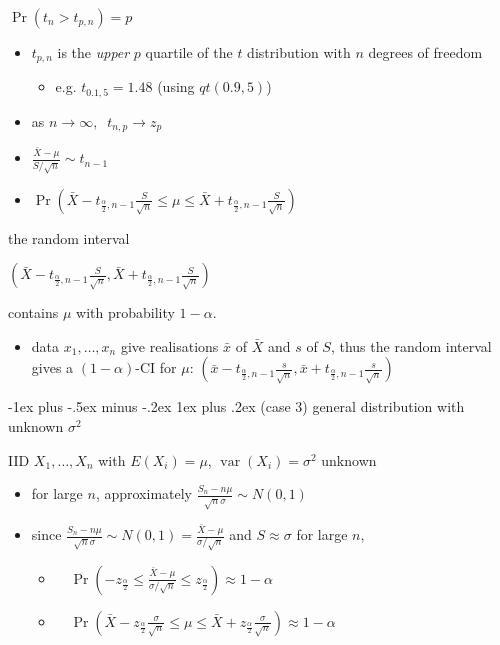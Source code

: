 \documentclass[10pt, landscape]{article}
\makeatletter
\renewcommand{\subsubsection}{\@startsection{subsubsection}{3}{0mm}%
  {-1ex plus -.5ex minus -.2ex}%
  {1ex plus .2ex}%
{\normalfont\small\bfseries}}%
\newcommand{\var}{\mathop{\mathrm{var}}}
\newcommand{\xbar}{\bar{x}}
\newcommand{\Xbar}{\bar{X}}
\newcommand{\seq}[2][n]{#2_1, \dots, #2_{#1}}
\makeatother
\begin{document}
\begin{multicols*}{4}
\begin{tightcenter}
    $\Pr(t_n > t_{p,n}) = p$
  \end{tightcenter}

  \begin{itemize}
    \item $t_{p,n}$ is the \textit{upper} $p$ quartile of the $t$ distribution with $n$ degrees of freedom
      \begin{itemize}
        \item e.g. $t_{0.1,5} = 1.48$ (using $qt(0.9,5)$)
      \end{itemize}
    \item as $n \to \infty, \;\; t_{n,p} \to z_p$
    \item $\frac{\Xbar - \mu}{S/\sqrt n} \sim t_{n-1}$
    \item $\Pr( \Xbar - t_{\frac{\alpha}{2}, n-1} \frac{S}{\sqrt n} \leq \mu \leq \Xbar + t_{\frac{\alpha}{2}, n-1} \frac{S}{\sqrt n})$
  \end{itemize}

  \begin{tightcenter}
    the random interval

    $\left(\Xbar - t_{\frac{\alpha}{2}, n-1} \frac{S}{\sqrt n},  \Xbar + t_{\frac{\alpha}{2}, n-1} \frac{S}{\sqrt n}\right)$

    contains $\mu$ with probability $1-\alpha$.
  \end{tightcenter}

  \begin{itemize}
    \item data $\seq{x}$ give realisations $\xbar$ of $\Xbar$ and $s$ of $S$, thus the random interval gives a $(1-\alpha)$-CI for $\mu$: 
      $\left(\xbar - t_{\frac{\alpha}{2}, n-1} \frac{s}{\sqrt n},  \xbar + t_{\frac{\alpha}{2}, n-1} \frac{s}{\sqrt n}\right)$
  \end{itemize}

  \subsubsection{(case 3) general distribution with unknown $\sigma^2$}

  IID $\seq{X}$ with $E(X_i) =\mu$, $\var(X_i) = \sigma^2$ unknown

  \begin{itemize}
    \item for large $n$, approximately $\frac{S_n - n\mu}{\sqrt n \sigma} \sim N(0,1)$
    \item since $\frac{S_n - n\mu}{\sqrt n \sigma} \sim N(0,1) =  \frac{\Xbar - \mu}{\sigma / \sqrt n}$ and $S \approx \sigma$ for large $n$,
      \begin{itemize}
        \item $\quad \Pr(-z_{\frac{\alpha}{2}} \leq \frac{\Xbar - \mu}{\sigma / \sqrt n} \leq z_{\frac{\alpha}{2}}) \approx 1 - \alpha$
        \item $\quad \Pr(\Xbar-z_{\frac{\alpha}{2}}\frac{\sigma}{\sqrt n} \leq \mu \leq \Xbar + z_{\frac{\alpha}{2}}\frac{\sigma}{\sqrt n}) \approx 1 - \alpha$
      \end{itemize}
  \end{itemize}


\end{multicols*}
\end{document}
